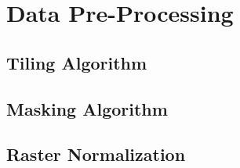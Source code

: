 \section{Data Pre-Processing}
\label{sec:pre-processing}



\subsection{Tiling Algorithm}


\subsection{Masking Algorithm}\label{sec:masking}


\subsection{Raster Normalization}\label{sec:raster-normalization}

